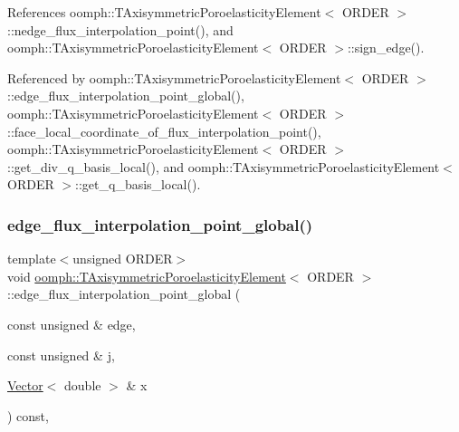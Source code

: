 References oomph\+::\+T\+Axisymmetric\+Poroelasticity\+Element$<$ O\+R\+D\+E\+R $>$\+::nedge\+\_\+flux\+\_\+interpolation\+\_\+point(), and oomph\+::\+T\+Axisymmetric\+Poroelasticity\+Element$<$ O\+R\+D\+E\+R $>$\+::sign\+\_\+edge().



Referenced by oomph\+::\+T\+Axisymmetric\+Poroelasticity\+Element$<$ O\+R\+D\+E\+R $>$\+::edge\+\_\+flux\+\_\+interpolation\+\_\+point\+\_\+global(), oomph\+::\+T\+Axisymmetric\+Poroelasticity\+Element$<$ O\+R\+D\+E\+R $>$\+::face\+\_\+local\+\_\+coordinate\+\_\+of\+\_\+flux\+\_\+interpolation\+\_\+point(), oomph\+::\+T\+Axisymmetric\+Poroelasticity\+Element$<$ O\+R\+D\+E\+R $>$\+::get\+\_\+div\+\_\+q\+\_\+basis\+\_\+local(), and oomph\+::\+T\+Axisymmetric\+Poroelasticity\+Element$<$ O\+R\+D\+E\+R $>$\+::get\+\_\+q\+\_\+basis\+\_\+local().

\mbox{\label{classoomph_1_1TAxisymmetricPoroelasticityElement_a06f4ef6b5eeb141500e04e14ae673c39}} 
\subsubsection{\texorpdfstring{edge\+\_\+flux\+\_\+interpolation\+\_\+point\+\_\+global()}{edge\_flux\_interpolation\_point\_global()}}
{\footnotesize\ttfamily template$<$unsigned O\+R\+D\+ER$>$ \\
void \hyperlink{classoomph_1_1TAxisymmetricPoroelasticityElement}{oomph\+::\+T\+Axisymmetric\+Poroelasticity\+Element}$<$ O\+R\+D\+ER $>$\+::edge\+\_\+flux\+\_\+interpolation\+\_\+point\+\_\+global (\begin{DoxyParamCaption}\item[{const unsigned \&}]{edge,  }\item[{const unsigned \&}]{j,  }\item[{\hyperlink{classoomph_1_1Vector}{Vector}$<$ double $>$ \&}]{x }\end{DoxyParamCaption}) const\hspace{0.3cm}{\ttfamily [inline]}, {\ttfamily [virtual]}}



